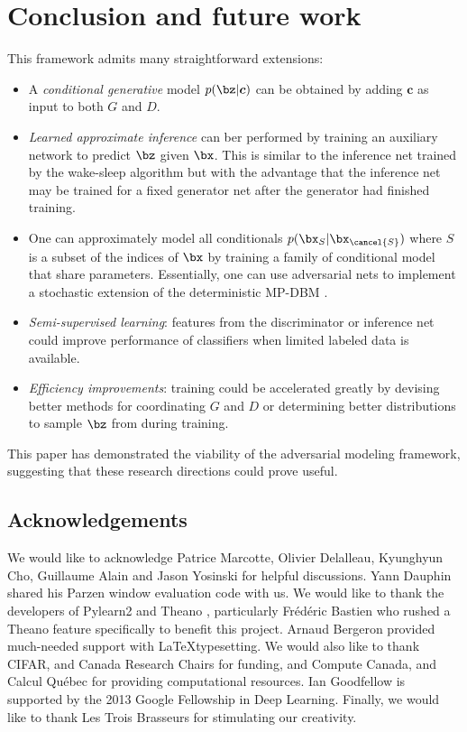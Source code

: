 \section{Conclusion and future work}

This framework admits many straightforward extensions:

\begin{itemize}
	\item A \emph{conditional generative} model $p(\bz | \boldsymbol{c})$ can be obtained by adding $\boldsymbol{c}$ as input to both $G$ and $D$.
	\item \emph{Learned approximate inference} can ber performed by training an auxiliary network to predict $\bz$ given $\bx$. This is similar to the inference net trained by the wake-sleep algorithm \cite{15_doi:10.1126/science.7761831} but with the advantage that the inference net may be trained for a fixed generator net after the generator had finished training.
	\item One can approximately model all conditionals $p(\bx_S | \bx_{\cancel{S}})$ %
	where $S$ is a subset of the indices of $\bx$ by training a family of conditional model that share parameters. Essentially, one can use adversarial nets to implement a stochastic extension of the deterministic MP-DBM \cite{11_NIPS2013_0bb4aec1}.
	\item \emph{Semi-supervised learning}: features from the discriminator or inference net could improve performance of classifiers when limited labeled data is available.
	\item \emph{Efficiency improvements}: training could be accelerated greatly by devising better methods for coordinating $G$ and $D$ or determining better distributions to sample $\bz$ from during training.
\end{itemize}

This paper has demonstrated the viability of the adversarial modeling framework, suggesting that these research directions could prove useful.

\subsection*{Acknowledgements}

We would like to acknowledge Patrice Marcotte, Olivier Delalleau, Kyunghyun Cho, Guillaume Alain and Jason Yosinski for helpful discussions. Yann Dauphin shared his Parzen window evaluation code with us. We would like to thank the developers of Pylearn2 \cite{12_goodfellow2013pylearn2machinelearningresearch} and Theano \cite{7_bergstra-proc-scipy-2010,1_bastien2012theanonewfeaturesspeed}, particularly Frédéric Bastien who rushed a Theano feature specifically to benefit this project. Arnaud Bergeron provided much-needed support with \LaTeX typesetting.  We would also like to thank CIFAR, and Canada Research Chairs for funding, and Compute Canada, and Calcul Québec for providing computational resources. Ian Goodfellow is supported by the 2013 Google Fellowship in Deep Learning. Finally, we would like to thank Les Trois Brasseurs for stimulating our creativity.
